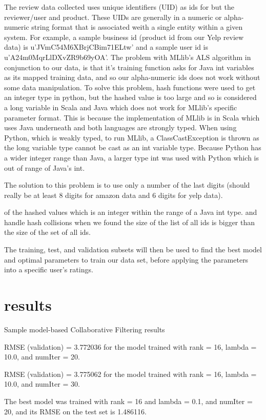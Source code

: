 \documentclass[conference]{IEEEtran}
\begin{document}
The review data collected uses unique identifiers (UID) as ids for but the reviewer/user and product.  These UIDs are generally in a numeric or alpha-numeric string format that is associated weith a single entity within a given system.  For example, a sample business id (product id from our Yelp review data) is u’JVmC54M6XBrjCBim71ELtw’ and a sample user id is u’A24m0MqrLlDXvZR9b69yOA’. 
The problem with MLlib's ALS algorithm in conjunction to our data, is that it's training function asks for Java int variables as its mapped training data, and so our alpha-numeric ids does not work without some data manipulation.  To solve this problem, hash functions were used to get an integer type in python, but the hashed value is too large and so is considered a long variable in Scala and Java which does not work for MLlib's specific parameter format.  This is because the implementation of MLlib is in Scala which uses Java underneath and both languages are strongly typed. When using Python, which is weakly typed, to run MLlib, a ClassCastException is thrown as the long variable type cannot be cast as an int variable type. Because Python has a wider integer range than Java, a larger type int was used with Python which is out of range of Java's int.

The solution to this problem is to use only a number of the last digits (should really be at least 8 digits for amazon data and 6 digits for yelp data). 

of the hashed values which is an integer within the range of a Java int type.
and handle hash collisions when we found the size of the list of all ids is bigger than the size of the set of all ids. 

The training, test, and validation subsets will then be used to find the best model and optimal parameters to train our data set, before applying the parameters into a specific user's ratings.


\section{results}

Sample model-based Collaborative Filtering results 

RMSE (validation) = 3.772036 for the model trained with rank = 16, lambda = 10.0, and numIter = 20.

RMSE (validation) = 3.775062 for the model trained with rank = 16, lambda = 10.0, and numIter = 30.

The best model was trained with rank = 16 and lambda = 0.1, and numIter = 20, and its RMSE on the test set is 1.486116.
\end{document}
